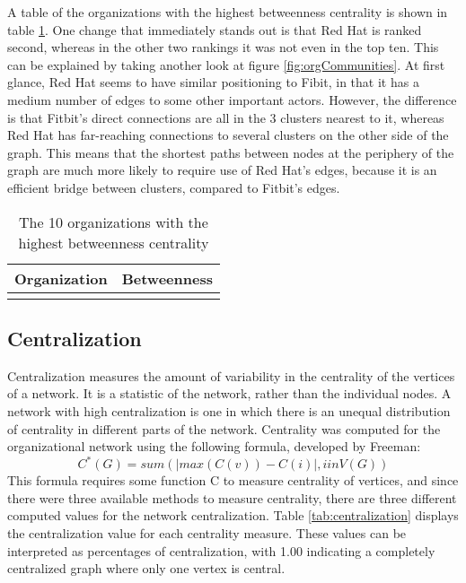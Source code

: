 A table of the organizations with the highest betweenness centrality is shown in table \ref{tab:betweenness}. One change that immediately stands out is that Red Hat is ranked second, whereas in the other two rankings it was not even in the top ten. This can be explained by taking another look at figure \ref{fig:orgCommunities}. At first glance, Red Hat seems to have similar positioning to Fibit, in that it has a medium number of edges to some other important actors. However, the difference is that Fitbit's direct connections are all in the 3 clusters nearest to it, whereas Red Hat has far-reaching connections to several clusters on the other side of the graph. This means that the shortest paths between nodes at the periphery of the graph are much more likely to require use of Red Hat's edges, because it is an efficient bridge between clusters, compared to Fitbit's edges.

\begin{table}
	\begin{tabular}{l|c}%
		\bfseries Organization & \bfseries Betweenness%
		\csvreader[head to column names]{betweenness.csv}{}%
		{\\\hline\organizationc & \scorec}%
	\end{tabular}
	\centering
	\caption{The 10 organizations with the highest betweenness centrality}\label{tab:betweenness}
\end{table}

\subsection{Centralization}
Centralization measures the amount of variability in the centrality of the vertices of a network. It is a statistic of the network, rather than the individual nodes. A network with high centralization is one in which there is an unequal distribution of centrality in different parts of the network.  Centrality was computed for the organizational network using the following formula, developed by Freeman\cite{freeman1978centrality}:
\begin{equation*}
C^*(G) = sum( |max(C(v))-C(i)|, i in V(G) )
\end{equation*}
This formula requires some function C to measure centrality of vertices, and since there were three available methods to measure centrality, there are three different computed values for the network centralization. Table \ref{tab:centralization} displays the centralization value for each centrality measure. These values can be interpreted as percentages of centralization, with 1.00 indicating a completely centralized graph where only one vertex is central.

